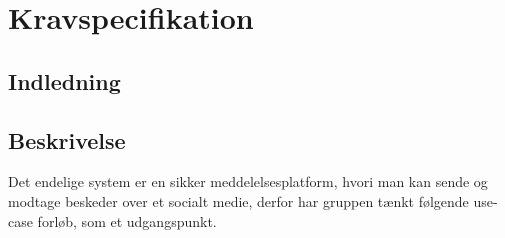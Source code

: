 \newpage
\section{Kravspecifikation}

\subsection{Indledning}

\subsection{Beskrivelse}
Det endelige system er en sikker meddelelsesplatform, hvori man kan sende og modtage beskeder over et socialt medie, derfor har gruppen tænkt følgende use-case forløb, som et udgangspunkt.

